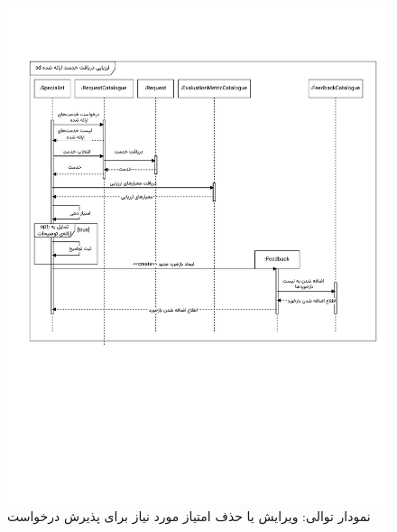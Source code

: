 \begin{figure}[ht!]
	\centering
	\includegraphics[scale=0.8, page=8]{figs/OOD-Sequence-3.pdf}
	\caption{نمودار توالی: ویرایش یا حذف امتیاز مورد نیاز برای پذیرش درخواست}
\end{figure}


